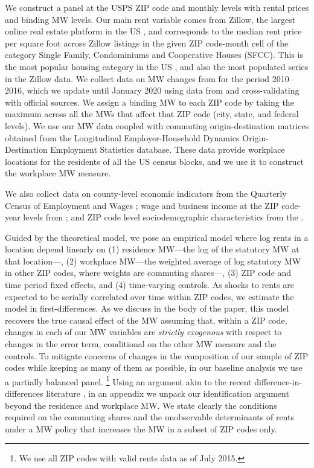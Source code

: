 We construct a panel at the USPS ZIP code and monthly levels with rental prices 
and binding MW levels.
Our main rent variable comes from Zillow, the largest online real estate 
platform in the US \parencite{realestateagentpdx, investopedia}, and corresponds 
to the median rent price per square foot across Zillow listings in the given ZIP 
code-month cell of the category Single Family, Condominiums and Cooperative 
Houses (SFCC).
This is the most popular housing category in the US \parencite{Fernald2020}, 
and also the most populated series in the Zillow data.
We collect data on MW changes from \textcite{VaghulZipperer2016} for the period 
2010--2016, which we update until January 2020 using data from 
\textcite{BerkeleyLaborCenter} and cross-validating with official sources.
We assign a binding MW to each ZIP code by taking the maximum across all the
MWs that affect that ZIP code (city, state, and federal levels).
We use our MW data coupled with commuting origin-destination matrices obtained 
from the Longitudinal Employer-Household Dynamics Origin-Destination Employment 
Statistics \parencite[LODES;][]{LODES} database.
These data provide workplace locations for the residents of all the US census 
blocks, and we use it to construct the workplace MW measure.

We also collect data on 
county-level economic indicators from the Quarterly Census of Employment and 
Wages \textcite[QCEW;][]{QCEW}; 
wage and business income at the ZIP code-year levels from \textcite{IRS}; and 
ZIP code level sociodemographic characteristics from the \textcite{ACS}.


Guided by the theoretical model, we pose an empirical model where log rents in 
a location depend linearly on
(1) residence MW---the log of the statutory MW at that location---,
(2) workplace MW---the weighted average of log statutory MW in other ZIP codes,
where weights are commuting shares---,
(3)  ZIP code and time period fixed effects,
and 
(4) time-varying controls.
As shocks to rents are expected to be serially correlated over time within ZIP 
codes, we estimate the model in first-differences.
As we discuss in the body of the paper, this model recovers the true causal 
effect of the MW assuming that, within a ZIP code, changes in each of our MW 
variables are \textit{strictly exogenous} with respect to changes in the error 
term, conditional on the other MW measure and the controls.
To mitigate concerns of changes in the composition of our sample of ZIP codes 
while keeping as many of them as possible, in our baseline analysis we use a 
partially balanced panel.%
\footnote{We use all ZIP codes with valid rents data as of July 2015.}
Using an argument akin to the recent difference-in-differences literature
\parencite[e.g.,][]{CallawayEtAl2021}, 
in an appendix we unpack our identification argument beyond the residence and
workplace MW. 
We state clearly the conditions required on the commuting shares and the 
unobservable determinants of rents under a MW policy that increases the MW in 
a subset of ZIP codes only.


